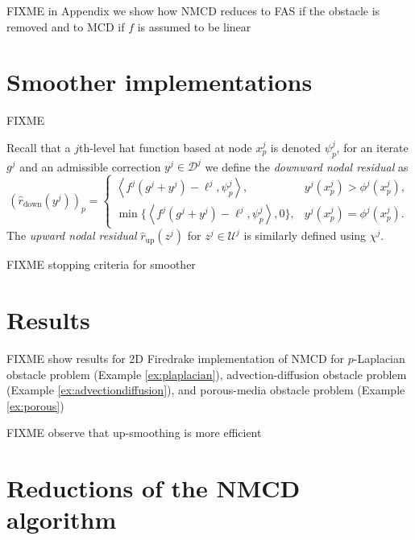 \documentclass[letterpaper,final,12pt,reqno]{amsart}
\theoremstyle{cstyle}
\theoremstyle{cstyle*}
\theoremstyle{dstyle}
\numberwithin{equation}{section}
\numberwithin{figure}{section}
\numberwithin{table}{section}
\numberwithin{theorem}{section}
\newcommand{\ip}[2]{\left<#1,#2\right>}
\begin{document}
FIXME in Appendix we show how NMCD reduces to FAS if the obstacle is removed and to MCD if $f$ is assumed to be linear



\section{Smoother implementations} \label{sec:smoothers}

FIXME

Recall that a $j$th-level hat function based at node $x_p^j$ is denoted $\psi_p^j$, for an iterate $g^j$ and an admissible correction $y^j \in \mathcal{D}^j$ we define the \emph{downward nodal residual} as
\begin{equation}
(\hat r_{\text{down}}(y^j))_p = \begin{cases} \ip{f^j(g^j+y^j)-\ell^j}{\psi_p^j}, & y^j(x_p^j) > \phi^j(x_p^j), \\
                                  \min\{\ip{f^j(g^j+y^j)-\ell^j}{\psi_p^j},0\}, & y^j(x_p^j) = \phi^j(x_p^j). \end{cases} \label{eq:cpresidual}
\end{equation}
The \emph{upward nodal residual} $\hat r_{\text{up}}(z^j)$ for $z^j \in \mathcal{U}^j$ is similarly defined using $\chi^j$.

FIXME stopping criteria for smoother


\section{Results} \label{sec:results}

FIXME show results for 2D Firedrake implementation of NMCD for $p$-Laplacian obstacle problem (Example \ref{ex:plaplacian}), advection-diffusion obstacle problem (Example \ref{ex:advectiondiffusion}), and porous-media obstacle problem (Example \ref{ex:porous})

FIXME observe that up-smoothing is more efficient







\appendix
\section{Reductions of the NMCD algorithm}
\end{document}
